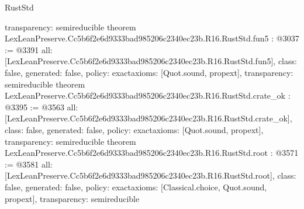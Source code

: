 \begin{lexlean}{RustStd}
\begin{coremodule}
{  transparency: semireducible
}
theorem LexLeanPreserve.Cc5b6f2e6d9333bad985206c2340ec23b.R16.RustStd.fun5 : @3037 := @3391 {
  all: [LexLeanPreserve.Cc5b6f2e6d9333bad985206c2340ec23b.R16.RustStd.fun5],
  class: false,
  generated: false,
  policy: exact{axioms: [Quot.sound, propext]},
  transparency: semireducible
}
theorem LexLeanPreserve.Cc5b6f2e6d9333bad985206c2340ec23b.R16.RustStd.crate_ok : @3395 := @3563 {
  all: [LexLeanPreserve.Cc5b6f2e6d9333bad985206c2340ec23b.R16.RustStd.crate_ok],
  class: false,
  generated: false,
  policy: exact{axioms: [Quot.sound, propext]},
  transparency: semireducible
}
theorem LexLeanPreserve.Cc5b6f2e6d9333bad985206c2340ec23b.R16.RustStd.root : @3571 := @3581 {
  all: [LexLeanPreserve.Cc5b6f2e6d9333bad985206c2340ec23b.R16.RustStd.root],
  class: false,
  generated: false,
  policy: exact{axioms: [Classical.choice, Quot.sound, propext]},
  transparency: semireducible
}


\end{coremodule}
\end{lexlean}
